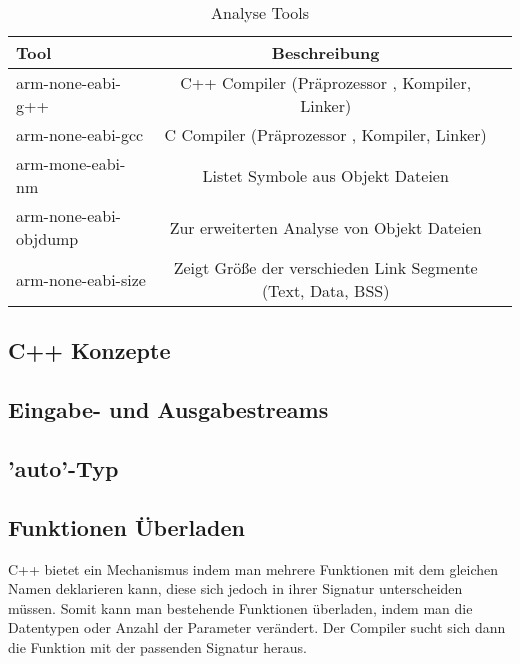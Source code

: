 \documentclass[MES,Master,ngerman]{twbook}%
\begin{document}
\begin{table}[!htb]
	\centering
	\begin{tabular}{| l | c | r |}
		\hline
		\textbf{Tool}  & \textbf{Beschreibung} \\ \hline
		arm-none-eabi-g++           & C++ Compiler (Präprozessor , Kompiler, Linker) \\ \hline
		arm-none-eabi-gcc       	& C	  Compiler (Präprozessor , Kompiler, Linker) \\ \hline
		arm-mone-eabi-nm        	& Listet Symbole aus Objekt Dateien \\ \hline
		arm-none-eabi-objdump		& Zur erweiterten Analyse von Objekt Dateien \\ \hline
		arm-none-eabi-size			& Zeigt Größe der verschieden Link Segmente (Text, Data, BSS) \\ \hline
	\end{tabular}
	
	\caption{Analyse Tools}
	\label{tbl:analystools}
	
\end{table}

\subsection{C++ Konzepte}
\subsection{Eingabe- und Ausgabestreams}

\newpage
\subsection{'auto'-Typ}
\newpage
\subsection{Funktionen Überladen}
C++ bietet ein Mechanismus indem man mehrere Funktionen mit dem gleichen Namen deklarieren kann, diese sich jedoch in ihrer Signatur unterscheiden müssen. Somit kann man bestehende Funktionen überladen, indem man die Datentypen oder Anzahl der Parameter verändert. Der Compiler sucht sich dann die Funktion mit der passenden Signatur heraus. 
\end{document}
